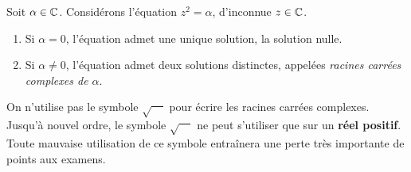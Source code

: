 \begin{proposition}
Soit $\alpha\in\mathbb{C}$.
Considérons l'équation $z^2=\alpha$, d'inconnue $z\in\mathbb{C}$.
\begin{enumerate}
\item Si $\alpha=0$, l'équation admet une unique solution, la solution nulle.
\item Si $\alpha\neq 0$, l'équation admet deux solutions distinctes, appelées \emph{racines carrées complexes de $\alpha$}.
\end{enumerate}
\end{proposition}

\begin{attention}
On n'utilise pas le symbole $\sqrt{\phantom{aa}}$ pour écrire les racines carrées complexes. Jusqu'à nouvel ordre, le symbole $\sqrt{\phantom{aa}}$ ne peut s'utiliser que sur un \textbf{réel positif}. Toute mauvaise utilisation de ce symbole entraînera une perte très importante de points aux examens.
\end{attention}